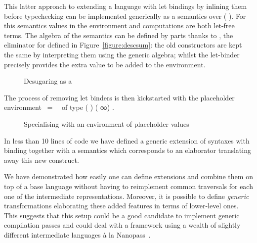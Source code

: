 This latter approach to extending a language  with let bindings
by inlining them before typechecking can be implemented generically as
a semantics over (  ). For this semantics values
in the environment and computations are both let-free terms. The algebra
of the semantics can be defined by parts thanks to , the eliminator
for  defined in Figure~\ref{figure:descsum}:
the old constructors are kept the same by
interpreting them using the generic  algebra;
whilst the let-binder precisely provides the extra value to be added to the
environment.

\begin{figure}[h]
\caption{Desugaring as a \label{defn:UnLet}}
\end{figure}

The process of removing let binders is then kickstarted with the placeholder
environment ~=~~ 
of type {( ) (  ∞) }. 

\begin{figure}[h]
\caption{Specialising  with an environment of placeholder values\label{defn:unlet}}
\end{figure}

In less than 10 lines of code we have defined a generic extension of
syntaxes with binding together with a semantics which corresponds
to an elaborator translating away this new construct.

We have demonstrated how easily one can define extensions and combine
them on top of a base language without having to reimplement common
traversals for each one of the intermediate representations. Moreover,
it is possible to define \emph{generic} transformations elaborating
these added features in terms of lower-level ones. This suggests that
this setup could be a good candidate to implement generic compilation
passes and could deal with a framework using a wealth of slightly
different intermediate languages à la Nanopass~\cite{Keep:2013:NFC:2544174.2500618}.
